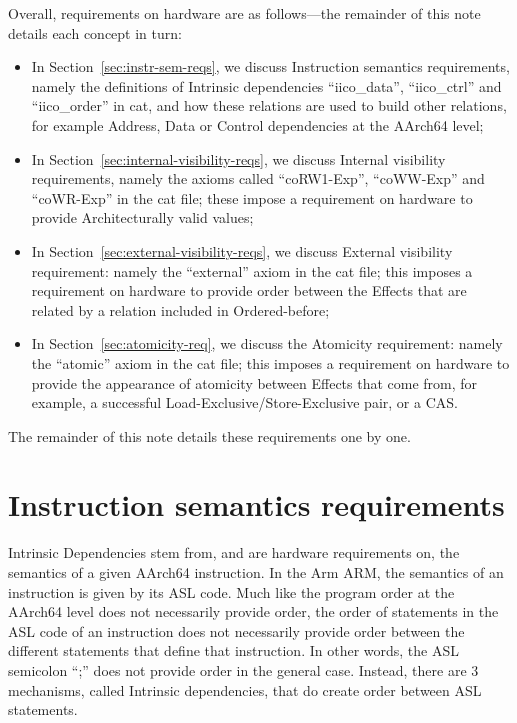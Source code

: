 \documentclass{book}
\begin{document}
Overall, requirements on hardware are as follows---the remainder of this note details each concept in turn: 
\begin{itemize}
\item In Section~\ref{sec:instr-sem-reqs}, we discuss Instruction semantics
requirements, namely the definitions of Intrinsic dependencies ``iico\_data'',
``iico\_ctrl'' and ``iico\_order'' in cat, and how these relations are used to
build other relations, for example Address, Data or Control dependencies at the
AArch64 level; 

\item In Section~\ref{sec:internal-visibility-reqs}, we discuss Internal
visibility requirements, namely the axioms called ``coRW1-Exp'', ``coWW-Exp''
and ``coWR-Exp'' in the cat file; these impose a requirement on hardware to
provide Architecturally valid values;   

\item In Section~\ref{sec:external-visibility-reqs}, we discuss External
visibility requirement: namely the ``external'' axiom in the cat file; this
imposes a requirement on hardware to provide order between the Effects that are
related by a relation included in Ordered-before;  

\item In Section~\ref{sec:atomicity-req}, we discuss the Atomicity requirement:
  namely the ``atomic'' axiom in the cat file; this imposes a requirement on
    hardware to provide the appearance of atomicity between Effects that come
    from, for example, a successful Load-Exclusive/Store-Exclusive pair,  or a
    CAS.
\end{itemize}

The remainder of this note details these requirements one by one. 

\section{Instruction semantics requirements \label{sec:instr-sem-reqs}}

Intrinsic Dependencies stem from, and are hardware requirements on, the semantics of a
given AArch64 instruction. In the Arm ARM, the
semantics of an instruction is given by its ASL code.  
Much like the program order at the AArch64 level does
not necessarily provide order, the order of
statements in the ASL code of an instruction does not
necessarily provide order between the different
statements that define that instruction. In other
words, the ASL semicolon ``;'' does not provide order
in the general case. Instead, there are 3 mechanisms,
called Intrinsic dependencies, that do create order
between ASL statements.  
 
\end{document}
